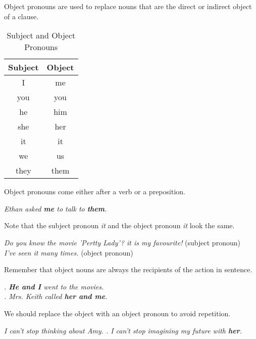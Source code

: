 \documentclass[hidelinks,10pt,a4paper]{article}
\begin{document}
Object pronouns are used to replace nouns that are the direct or indirect object of a clause.
\begin{table}[h]
\begin{center}
\begin{tabular}{|c|c|}
	\hline
	\textbf{Subject} & \textbf{Object} \\
	\hline
	I & me \\ \hline
	you & you \\ \hline
	he & him \\ \hline
	she & her \\ \hline
	it & it \\ \hline
	we & us \\ \hline
	they & them \\
	\hline
\end{tabular}
\end{center}
\caption{\label{tab:nouns5}Subject and Object Pronouns}
\end{table}

Object pronouns come either after a verb or a preposition.
\begin{center}
\textit{
Ethan asked \textbf{me} to talk to \textbf{them}.}
\end{center}

Note that the subject pronoun \textit{it} and the object pronoun \textit{it} look the same.

\begin{center}
\textit{
Do you know the movie 'Pertty Lady'? \textit{it} is my favourite!} (subject pronoun)\\
\textit{ I've seen \textit{it} many times.} (object pronoun)
\end{center}
Remember that object nouns are always the recipients of the action in sentence.
\begin{center}
\textit{
		. \textbf{He and I} went to the movies.\\
. Mrs. Keith called \textbf{her and me}.}
\end{center}

We should replace the object with an object pronoun to avoid repetition.
\begin{center}
\textit{
I can't stop thinking about Amy. . I can't stop imagining my future with \textbf{her}.}
\end{center}
\end{document}

